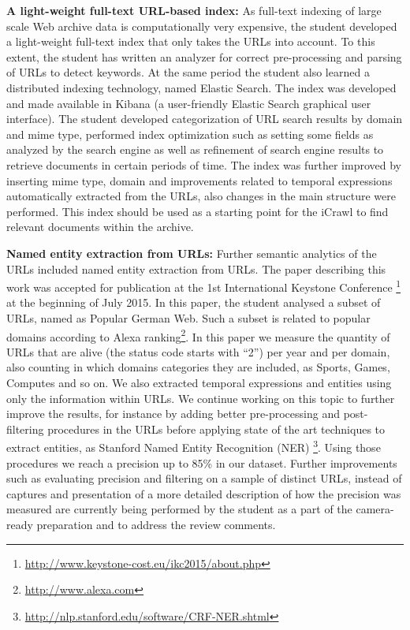\documentclass[a4paper,11pt]{report}
\begin{document}
\textbf{A light-weight full-text URL-based index:}
As full-text indexing of large scale Web archive data is computationally very expensive,
the student developed a light-weight full-text index that only takes the URLs into account.
To this extent, the student has written an analyzer for correct pre-processing 
and parsing of URLs to detect keywords. 
%
At the same period the student also learned a distributed indexing technology, named Elastic
Search. The index was
developed and made available in Kibana (a user-friendly Elastic Search graphical user
interface). 
%
The student developed categorization of 
URL search results by domain and mime type, performed index optimization such as setting some fields as analyzed 
by the search engine as well as refinement of search engine results to retrieve documents in certain 
periods of time. 
%
The index was further improved by inserting mime type, domain and
improvements related to temporal expressions automatically 
extracted from the URLs, also changes in the main
structure were performed. This index should be used as a starting point for the iCrawl
to find relevant documents within the archive. 

\textbf{Named entity extraction from URLs:}
Further semantic analytics of the URLs included named entity extraction from URLs. 
The paper describing this work was accepted for publication at the 
1st International Keystone Conference
\footnote{\url{http://www.keystone-cost.eu/ikc2015/about.php}} at the beginning of
July 2015. 
In this paper, the student analysed a subset of URLs, named as Popular German
Web. Such a subset is related to popular domains according to Alexa
ranking\footnote{\url{http://www.alexa.com}}. In this paper we measure the
quantity of URLs that are alive (the status code starts with ``2'') per year and per domain, 
also counting in which domains categories they are included, as Sports, Games,
Computes and so on. We also extracted temporal expressions
and entities using only the information within URLs.
%
We continue working on this topic to further improve the results, for instance by adding better
pre-processing and post-filtering procedures in the URLs before applying state
of the art techniques to extract entities, as Stanford Named Entity Recognition
(NER) \footnote{\url{http://nlp.stanford.edu/software/CRF-NER.shtml}}. Using
those procedures we reach a precision up to 85\% in our dataset. 
%
Further improvements such as evaluating
precision and filtering on a sample of distinct URLs, instead of captures and
presentation of a more detailed description of how the precision was measured are currently 
being performed by the student as a part of the camera-ready preparation
and to address the review comments.
\end{document}
